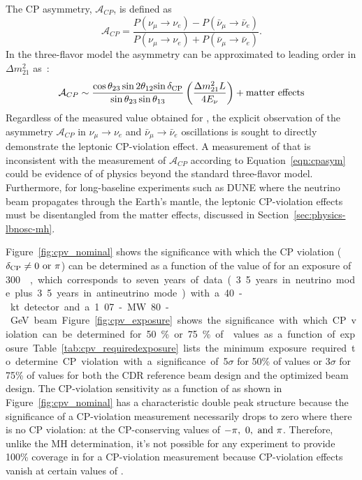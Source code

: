 The CP asymmetry,
$\mathcal{A}_{CP}$, is defined as 
\begin{equation}
\label{eqn:cp-asymm}
 \mathcal{A}_{CP} = \frac{P(\nu_\mu \rightarrow \nu_e) -
  P(\bar{\nu}_\mu \rightarrow \bar{\nu}_e)}{P(\nu_\mu \rightarrow
  \nu_e) + P(\bar{\nu}_\mu \rightarrow \bar{\nu}_e)}.
\end{equation}
In the three-flavor model the asymmetry can be approximated to leading
order in $\Delta m_{21}^2$ as~\cite{Marciano:2006uc}:
\begin{equation}
\mathcal{A}_{CP} \sim \frac{\cos \theta_{23} \sin 2 \theta_{12}
  {\sin \mdeltacp}}{\sin \theta_{23} \sin \theta_{13}}
\left(\frac{\Delta m^2_{21} L}{ 4 E_{\nu}}\right) + {\rm matter
  \ effects}
\label{eqn:cpasym}
\end{equation}
Regardless of the measured value obtained for \deltacp, the explicit
observation of the asymmetry $\mathcal{A}_{CP}$ in $\nu_{\mu}
\rightarrow \nu_e$ and $\bar{\nu}_{\mu} \rightarrow
\bar{\nu}_e$ oscillations is sought to directly demonstrate the
leptonic CP-violation effect.  A measurement of \deltacp that is
inconsistent with the measurement of $\mathcal{A}_{CP}$ according to
Equation~\ref{eqn:cpasym} could be evidence of of physics beyond the
standard three-flavor model.  Furthermore, for long-baseline
experiments such as DUNE where the neutrino beam propagates through
the Earth's mantle, the leptonic CP-violation effects must be
disentangled from the matter effects, discussed in
Section~\ref{sec:physics-lbnosc-mh}.

Figure~\ref{fig:cpv_nominal} shows the significance with which the CP
violation ($\mdeltacp \neq 0 \ {\rm or} \ \pi$) can be determined as a
function of the value of \deltacp for an exposure of \SI{300}~\ktMWyr,
which corresponds to seven years of data (3.5 years in neutrino mode
plus 3.5 years in antineutrino mode) with a 40-kt detector and a
1.07-MW 80-GeV beam.  Figure~\ref{fig:cpv_exposure} shows the significance
with which CP violation can be determined for 50\% or 75\% of \deltacp
values as a function of exposure.
Table~\ref{tab:cpv_requiredexposure} lists the minimum exposure
required to determine CP violation with a significance of 5$\sigma$
for 50\% of \deltacp values or 3$\sigma$ for 75\% of \deltacp values
for both the CDR reference beam design and the optimized beam design.
The CP-violation sensitivity as a function of \deltacp as shown in
Figure~\ref{fig:cpv_nominal} has a characteristic double peak
structure because the significance of a CP-violation measurement
necessarily drops to zero where there is no CP violation: at the
CP-conserving values of $-\pi,~0,~{\rm and}~\pi$.  Therefore, unlike
the MH determination, it's not possible for any experiment to provide
100\% coverage in \deltacp for a CP-violation measurement because CP-violation effects vanish at certain values of \deltacp.

